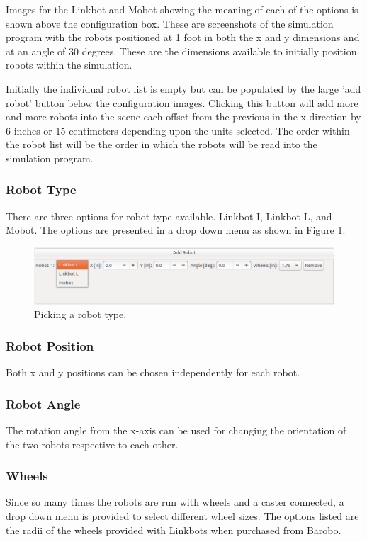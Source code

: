 \documentclass{article}
\begin{document}
Images for the Linkbot and Mobot showing the meaning of each of the options is
shown above the configuration box.  These are screenshots of the simulation
program with the robots positioned at 1 foot in both the x and y dimensions and
at an angle of 30 degrees.  These are the dimensions available to initially position
robots within the simulation.

Initially the individual robot list is empty but can be populated by the large
'add robot' button below the configuration images.  Clicking this button will
add more and more robots into the scene each offset from the previous in the
x-direction by 6 inches or 15 centimeters depending upon the units selected.
The order within the robot list will be the order in which the robots will be
read into the simulation program.

\subsubsection{Robot Type}
There are three options for robot type available.  Linkbot-I, Linkbot-L,
and Mobot.  The options are presented in a drop down menu as shown in
Figure \ref{fig:type}.
\begin{figure}[H]
	\begin{center}
		\includegraphics[width=6in]{images/type}
	\end{center}
	\caption{Picking a robot type.}
	\label{fig:type}
\end{figure}

\subsubsection{Robot Position}
Both x and y positions can be chosen independently for each robot.

\subsubsection{Robot Angle}
The rotation angle from the x-axis can be used for changing the orientation of
the two robots respective to each other. 

\subsubsection{Wheels}
Since so many times the robots are run with wheels and a caster connected, a
drop down menu is provided to select different wheel sizes.  The options listed
are the radii of the wheels provided with Linkbots when purchased from Barobo.
\end{document}
